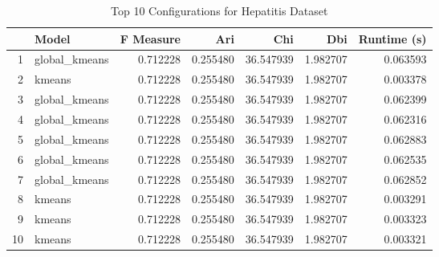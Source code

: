 \begin{table*}[ht!]
\caption{Top 10 Configurations for Hepatitis Dataset}
\label{tab:top_models_hepatitis}
\begin{tabular}{rlrrrrr}
 & Model & F Measure & Ari & Chi & Dbi & Runtime (s) \\\midrule

1 & global\_kmeans & 0.712228 & 0.255480 & 36.547939 & 1.982707 & 0.063593 \\
2 & kmeans & 0.712228 & 0.255480 & 36.547939 & 1.982707 & 0.003378 \\
3 & global\_kmeans & 0.712228 & 0.255480 & 36.547939 & 1.982707 & 0.062399 \\
4 & global\_kmeans & 0.712228 & 0.255480 & 36.547939 & 1.982707 & 0.062316 \\
5 & global\_kmeans & 0.712228 & 0.255480 & 36.547939 & 1.982707 & 0.062883 \\
6 & global\_kmeans & 0.712228 & 0.255480 & 36.547939 & 1.982707 & 0.062535 \\
7 & global\_kmeans & 0.712228 & 0.255480 & 36.547939 & 1.982707 & 0.062852 \\
8 & kmeans & 0.712228 & 0.255480 & 36.547939 & 1.982707 & 0.003291 \\
9 & kmeans & 0.712228 & 0.255480 & 36.547939 & 1.982707 & 0.003323 \\
10 & kmeans & 0.712228 & 0.255480 & 36.547939 & 1.982707 & 0.003321 \\
\end{tabular}
\end{table*}
